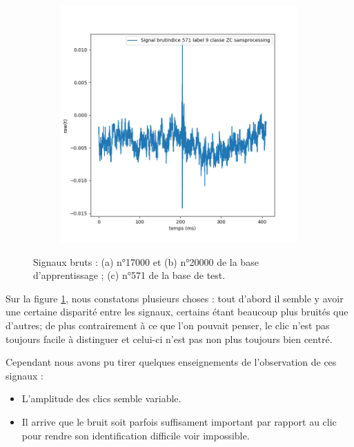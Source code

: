 \begin{figure}[!h]
\begin{subfigure}[b]{0.3\textwidth}
	\caption{}
  	\end{subfigure}
  	\begin{subfigure}[b]{0.3\textwidth}
    \includegraphics[width=\textwidth]{./images/indice571Spectro1Dlabel9classeZCsansprocessingsanszoom.png}
    	\caption{}
	\end{subfigure}
\caption{Signaux bruts : (a) n°17000 et (b) n°20000 de la base d'apprentissage ; (c) n°571 de la base de test.%
\label{fig:signauxbruts}}
\end{figure}

Sur la figure \ref{fig:signauxbruts}, nous constatons plusieurs choses : tout d'abord il semble y avoir une certaine disparité entre les signaux, certains étant beaucoup plus bruités que d'autres; de plus contrairement à ce que l'on pouvait penser, le clic n'est pas toujours facile à distinguer et celui-ci n'est pas non plus toujours bien centré.

Cependant nous avons pu tirer quelques enseignements de l'observation de ces signaux :
\begin{itemize}
\item L'amplitude des clics semble variable.
\item Il arrive que le bruit soit parfois suffisament important par rapport au clic pour rendre son identification difficile voir impossible.
\end{itemize}

